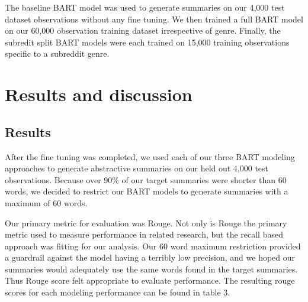 \documentclass[11pt,a4paper, twocolumn]{article}
\begin{document}
The baseline BART model was used to generate summaries on our 4,000 test dataset observations without any fine tuning.
We then trained a full BART model on our 60,000 observation training dataset irrespective of genre. 
Finally, the subredit split BART models were each trained on 15,000 training observations specific to a subreddit genre. 



\section{Results and discussion}

\subsection{Results}

After the fine tuning was completed, we used each of our three BART modeling approaches to generate abstractive summaries on 
our held out 4,000 test observations. Because over 90\% of our target summaries were shorter than 60 words, we decided to 
restrict our BART models to generate summaries with a maximum of 60 words. 

Our primary metric for evaluation was Rouge. 
Not only is Rouge the primary metric used to measure performance in related research, but the recall based approach 
was fitting for our analysis. Our 60 word maximum restriction provided a guardrail against the model having a terribly low precision, 
and we hoped our summaries would adequately use the same words found in the target summaries. 
Thus Rouge score felt appropriate to evaluate performance.
The resulting rouge scores for each modeling performance can be found in table 3.
\end{document}
